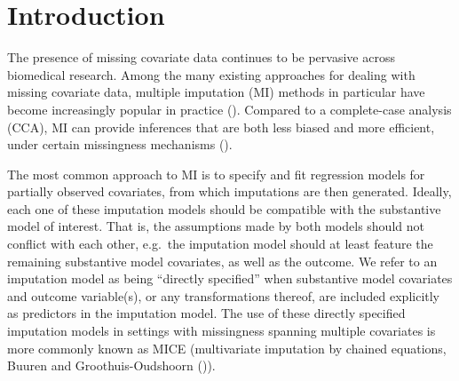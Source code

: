 \documentclass[
  letterpaper,
  DIV=11,
  numbers=noendperiod]{scrreprt}
\begin{document}
\hfill\break

\section{Introduction}\label{introduction-2}

The presence of missing covariate data continues to be pervasive across
biomedical research. Among the many existing approaches for dealing with
missing covariate data, multiple imputation (MI) methods in particular
have become increasingly popular in practice
(). Compared to a complete-case analysis (CCA), MI can provide
inferences that are both less biased and more efficient, under certain
missingness mechanisms
().

The most common approach to MI is to specify and fit regression models
for partially observed covariates, from which imputations are then
generated. Ideally, each one of these imputation models should be
compatible with the substantive model of interest. That is, the
assumptions made by both models should not conflict with each other,
e.g.~the imputation model should at least feature the remaining
substantive model covariates, as well as the outcome. We refer to an
imputation model as being ``directly specified'' when substantive model
covariates and outcome variable(s), or any transformations thereof, are
included explicitly as predictors in the imputation model. The use of
these directly specified imputation models in settings with missingness
spanning multiple covariates is more commonly known as MICE
(multivariate imputation by chained equations, Buuren and
Groothuis-Oudshoorn
()).
\end{document}
